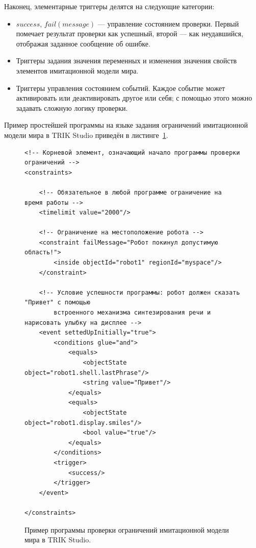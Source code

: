 \documentclass[a5paper]{article}
\begin{document}
Наконец, элементарные триггеры делятся на следующие категории:
\begin{itemize}
    \item $success$, $fail(message)$ --- управление состоянием проверки. Первый помечает результат проверки как успешный, второй --- как неудавшийся, отображая заданное сообщение об ошибке.
    \item Триггеры задания значения переменных и изменения значения свойств элементов имитационной модели мира.
    \item Триггеры управления состоянием событий. Каждое событие может активировать или деактивировать другое или себя; с помощью этого можно задавать сложную логику проверки.
\end{itemize}

Пример простейшей программы на языке задания ограничений имитационной модели мира в TRIK Studio приведён в листинге~\ref{code:constraints}.

\captionsetup[figure]{name=Листинг}
\setcounter{figure}{0}

\begin{figure}[!t]
\begin{verbatim}
<!-- Корневой элемент, означающий начало программы проверки ограничений -->
<constraints>

    <!-- Обязательное в любой программе ограничение на время работы -->
    <timelimit value="2000"/>

    <!-- Ограничение на местоположение робота -->
    <constraint failMessage="Робот покинул допустимую область!">
        <inside objectId="robot1" regionId="myspace"/>
    </constraint>

    <!-- Условие успешности программы: робот должен сказать "Привет" с помощью
        встроенного механизма синтезирования речи и нарисовать улыбку на дисплее -->
    <event settedUpInitially="true">
        <conditions glue="and">
            <equals>
                <objectState object="robot1.shell.lastPhrase"/>
                <string value="Привет"/>
            </equals>
            <equals>
                <objectState object="robot1.display.smiles"/>
                <bool value="true"/>
            </equals>
        </conditions>
        <trigger>
            <success/>
        </trigger>
    </event>

</constraints>
\end{verbatim}
\caption{Пример программы проверки ограничений имитационной модели мира в TRIK Studio.}
\label{code:constraints}
\end{figure}
\end{document}
